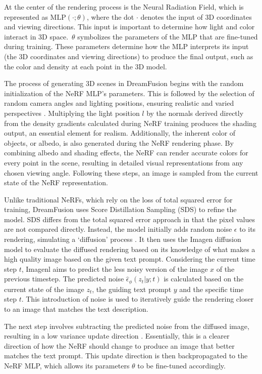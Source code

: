 At the center of the rendering process is the Neural Radiation Field, which is represented as \( \text{MLP}(\cdot; \theta) \), where the dot \(\cdot\) denotes the input of 3D coordinates and viewing directions. This input is important to determine how light and color interact in 3D space.~\(\theta\) symbolizes the parameters of the MLP that are fine-tuned during training. These parameters determine how the MLP interprets its input (the 3D coordinates and viewing directions) to produce the final output, such as the color and density at each point in the 3D model.

The process of generating 3D scenes in DreamFusion begins with the random initialization of the NeRF MLP's parameters. This is followed by the selection of random camera angles and lighting positions, ensuring realistic and varied perspectives \citep{pooleDreamfusion}. Multiplying the light position \( l \) by the normals derived directly from the density gradients calculated during NeRF training produces the shading output, an essential element for realism. Additionally, the inherent color of objects, or albedo, is also generated during the NeRF rendering phase. By combining albedo and shading effects, the NeRF can render accurate colors for every point in the scene, resulting in detailed visual representations from any chosen viewing angle. Following these steps, an image is sampled from the current state of the NeRF representation.

Unlike traditional NeRFs, which rely on the loss of total squared error for training, DreamFusion uses Score Distillation Sampling (SDS) to refine the model. SDS differs from the total squared error approach in that the pixel values are not compared directly. Instead, the model initially adds random noise \(\epsilon\) to its rendering, simulating a `diffusion' process \citep{pooleDreamfusion}. It then uses the Imagen diffusion model to evaluate the diffused rendering based on its knowledge of what makes a high quality image based on the given text prompt. Considering the current time step \(t\), Imagenl aims to predict the less noisy version of the image \(x\) of the previous timestep. The predicted noise \( \hat{\epsilon}_\phi(z_t | y; t) \) is calculated based on the current state of the image \(z_t\), the guiding text prompt \(y\) and the specific time step \(t\). This introduction of noise is used to iteratively guide the rendering closer to an image that matches the text description.

The next step involves subtracting the predicted noise from the diffused image, resulting in a low variance update direction \citep{pooleDreamfusion}. Essentially, this is a clearer direction of how the NeRF should change to produce an image that better matches the text prompt. This update direction is then backpropagated to the NeRF MLP, which allows its parameters \(\theta\) to be fine-tuned accordingly.

